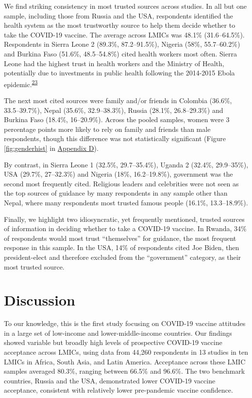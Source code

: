 \documentclass[
  12pt,
]{article}
\begin{document}
We find striking consistency in most trusted sources across studies. In all but one sample, including those from Russia and the USA, respondents identified the health system as the most trustworthy source to help them decide whether to take the COVID-19 vaccine. The average across LMICs was 48.1\% (31.6--64.5\%). Respondents in Sierra Leone 2 (89.3\%, 87.2--91.5\%), Nigeria (58\%, 55.7--60.2\%) and Burkina Faso (51.6\%, 48.5--54.8\%) cited health workers most often. Sierra Leone had the highest trust in health workers and the Ministry of Health, potentially due to investments in public health following the 2014-2015 Ebola epidemic.\textsuperscript{\protect\hyperlink{ref-deserrano}{23}}

The next most cited sources were family and/or friends in Colombia (36.6\%, 33.5--39.7\%), Nepal (35.6\%, 32.9--38.3\%), Russia (28.1\%, 26.8--29.3\%) and Burkina Faso (18.4\%, 16--20.9\%). Across the pooled samples, women were 3 percentage points more likely to rely on family and friends than male respondents, though this difference was not statistically significant (Figure \ref{fig:genderhist} in \protect\hyperlink{appendixd}{Appendix D}).

By contrast, in Sierra Leone 1 (32.5\%, 29.7--35.4\%), Uganda 2 (32.4\%, 29.9--35\%), USA (29.7\%, 27--32.3\%) and Nigeria (18\%, 16.2--19.8\%), government was the second most frequently cited. Religious leaders and celebrities were not seen as the top sources of guidance by many respondents in any sample other than Nepal, where many respondents most trusted famous people (16.1\%, 13.3--18.9\%).

Finally, we highlight two idiosyncratic, yet frequently mentioned, trusted sources of information in deciding whether to take a COVID-19 vaccine. In Rwanda, 34\% of respondents would most trust ``themselves'' for guidance, the most frequent response in this sample. In the USA, 14\% of respondents cited Joe Biden, then president-elect and therefore excluded from the ``government'' category, as their most trusted source.

\hypertarget{discussion}{%
\section*{Discussion}\label{discussion}}

To our knowledge, this is the first study focusing on COVID-19 vaccine attitudes in a large set of low-income and lower-middle-income countries. Our findings showed variable but broadly high levels of prospective COVID-19 vaccine acceptance across LMICs, using data from 44,260 respondents in 13 studies in ten LMICs in Africa, South Asia, and Latin America. Acceptance across these LMIC samples averaged 80.3\%, ranging between 66.5\% and 96.6\%. The two benchmark countries, Russia and the USA, demonstrated lower COVID-19 vaccine acceptance, consistent with relatively lower pre-pandemic vaccine confidence.
\end{document}
